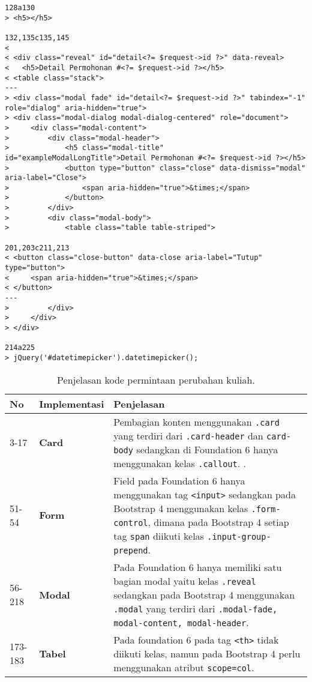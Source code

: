 \begin{lstlisting}
128a130
> <h5></h5>

132,135c135,145
< 
< <div class="reveal" id="detail<?= $request->id ?>" data-reveal>
< 	<h5>Detail Permohonan #<?= $request->id ?></h5>
< <table class="stack">
---
> <div class="modal fade" id="detail<?= $request->id ?>" tabindex="-1" role="dialog" aria-hidden="true">
> <div class="modal-dialog modal-dialog-centered" role="document">
>     <div class="modal-content">
>         <div class="modal-header">
>             <h5 class="modal-title" id="exampleModalLongTitle">Detail Permohonan #<?= $request->id ?></h5>
>             <button type="button" class="close" data-dismiss="modal" aria-label="Close">
>                 <span aria-hidden="true">&times;</span>
>             </button>
>         </div>
>         <div class="modal-body">
>             <table class="table table-striped">

201,203c211,213
< <button class="close-button" data-close aria-label="Tutup" type="button">
<     <span aria-hidden="true">&times;</span>
< </button>
---
>         </div>
>     </div>
> </div>

214a225
> jQuery('#datetimepicker').datetimepicker();
\end{lstlisting}

\begin{table}[H]
	\centering
	\caption{Penjelasan kode permintaan perubahan kuliah.}
	\label{tabel:permintaanPerubahanKuliah}
	\begin{tabularx}{\textwidth}{llX}
		\toprule
		No & Implementasi     & Penjelasan \\
		\midrule
		3-17 & \textbf{Card} & Pembagian konten menggunakan \texttt{.card} yang terdiri dari \texttt{.card-header} dan \texttt{card-body} sedangkan di Foundation 6 hanya menggunakan kelas \texttt{.callout}. .\\
		51-54 & \textbf{Form}  & Field pada Foundation 6 hanya menggunakan tag \texttt{<input>} sedangkan pada Bootstrap 4 menggunakan kelas \texttt{.form-control}, dimana pada Bootstrap 4 setiap tag \texttt{span} diikuti kelas \texttt{.input-group-prepend}.\\
		56-218 & \textbf{Modal}  & Pada Foundation 6 hanya memiliki satu bagian modal yaitu kelas \texttt{.reveal} sedangkan pada Bootstrap 4 menggunakan \texttt{.modal} yang terdiri dari \texttt{.modal-fade, modal-content, modal-header}.\\
		173-183 &\textbf{Tabel} & Pada foundation 6 pada tag \texttt{<th>} tidak diikuti kelas, namun pada Bootstrap 4 perlu menggunakan atribut \texttt{scope=col}.\\
		\bottomrule
	\end{tabularx}%
\end{table}

